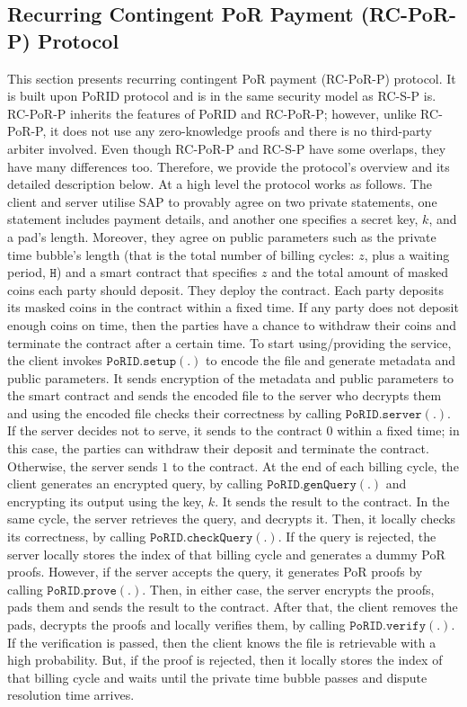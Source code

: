 
\subsection{Recurring Contingent PoR Payment (RC-PoR-P) Protocol}
This section presents recurring contingent PoR payment (RC-PoR-P) protocol. It is built upon PoRID protocol and is in the same security model as RC-S-P is. RC-PoR-P inherits the features of PoRID and RC-PoR-P; however, unlike RC-PoR-P, it does not use any zero-knowledge proofs and there is no third-party arbiter involved. Even though RC-PoR-P and RC-S-P have some overlaps, they have many differences too. Therefore, we provide the protocol’s overview and its detailed description below.
At a high level the protocol works as follows. The client and server utilise SAP to provably agree on two private statements, one statement includes payment details, and another one specifies a secret key, $k$, and a pad's length. Moreover, they  agree on public parameters such as the private time bubble's length (that is the total number of billing cycles: $z$, plus a waiting period, $\texttt{H}$) and a smart contract that specifies $z$ and the total amount of masked coins each party should deposit. They deploy the contract. Each party deposits its masked coins in the contract within a fixed time. If any party does not deposit enough coins on time, then the parties have a chance to withdraw their coins and terminate the contract after a certain time. To start using/providing the service, the client invokes $\mathtt{PoRID.setup}(.)$ to encode the file and generate  metadata and public parameters. It sends  encryption of the metadata and public parameters to the smart contract and sends the encoded file to the server who decrypts them and using the encoded file checks their correctness by calling $\mathtt{PoRID.server}(.)$. If the server decides not to serve, it sends to the contract $0$ within a fixed time; in this case, the parties can withdraw their deposit and terminate the contract. Otherwise, the server sends $1$ to the contract. 
At the end of each billing cycle, the client generates an encrypted query, by calling $\mathtt{PoRID.genQuery(.)}$ and encrypting its output using the key, $k$. It sends the result to the contract. In the same cycle, the server retrieves the query, and decrypts it. Then, it locally checks its correctness, by calling $\mathtt{PoRID.checkQuery(.)}$. If the query is rejected, the server locally stores the index of that billing cycle and generates a dummy PoR proofs. However, if the server accepts the query, it generates PoR proofs by calling $\mathtt{PoRID.prove(.)}$. Then, in either case, the server encrypts the proofs, pads them and sends the result to the contract. After that, the client removes the pads, decrypts the proofs and locally verifies them, by calling $\mathtt{PoRID.verify(.)}$. If the verification is passed, then the client knows the file is retrievable with a high probability. But, if the proof is rejected, then it locally stores the index of that billing cycle and waits until the private time bubble passes and dispute resolution time arrives. 

